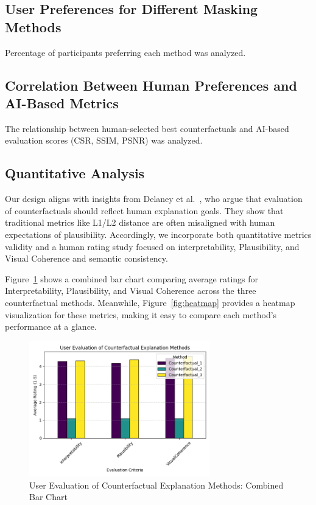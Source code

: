 \subsection{User Preferences for Different Masking Methods}
Percentage of participants preferring each method was analyzed.


\subsection{Correlation Between Human Preferences and AI-Based Metrics}
The relationship between human-selected best counterfactuals and AI-based evaluation scores (CSR, SSIM, PSNR) was analyzed.




\subsection{Quantitative Analysis}
\label{subsec:quantitative_analysis}

Our design aligns with insights from Delaney et al.~\cite{DELANEY2023103995}, who argue that evaluation of counterfactuals should reflect human explanation goals. They show that traditional metrics like L1/L2 distance are often misaligned with human expectations of plausibility. Accordingly, we incorporate both quantitative metrics validity and a human rating study focused on interpretability, Plausibility, and Visual Coherence and semantic consistency.

Figure~\ref{fig:barPlotAll} shows a combined bar chart comparing average ratings for Interpretability, Plausibility, and Visual Coherence 
across the three counterfactual methods. Meanwhile, Figure~\ref{fig:heatmap} provides a heatmap visualization for these metrics, 
making it easy to compare each method's performance at a glance.

\begin{figure}[htbp]
    \centering
    \includegraphics[width=0.7\textwidth]{img/results/bar_plot_user_evaluations.png}
    \caption{User Evaluation of Counterfactual Explanation Methods: Combined Bar Chart}
    \label{fig:barPlotAll}
\end{figure}

